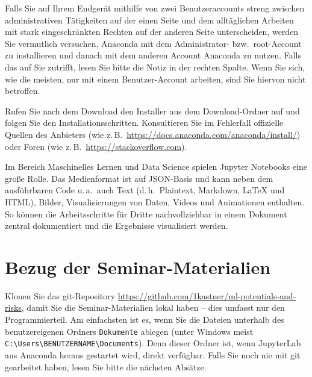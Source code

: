 \documentclass[nobib]{tufte-handout}
\begin{document}
Falls Sie auf Ihrem Endgerät mithilfe von zwei Benutzeraccounts streng zwischen administrativen Tätigkeiten auf der einen Seite und dem alltäglichen Arbeiten mit stark eingeschränkten Rechten auf der anderen Seite unterscheiden, werden Sie vermutlich versuchen, Anaconda mit dem Administrator- bzw.\ root-Account zu installieren und danach mit dem anderen Account Anaconda zu nutzen.
Falls das auf Sie zutrifft, lesen Sie bitte die Notiz in der rechten Spalte.
%
Wenn Sie sich, wie die meisten, nur mit einem Benutzer-Account arbeiten, sind Sie hiervon nicht betroffen.

Rufen Sie nach dem Download den Installer aus dem Download-Ordner auf und folgen Sie den Installationsschritten.
Konsultieren Sie im Fehlerfall offizielle Quellen des Anbieters
(wie z.\,B.\ \url{https://docs.anaconda.com/anaconda/install/})
oder Foren
(wie z.\,B.\ \url{https://stackoverflow.com}).


Im Bereich Maschinelles Lernen und Data Science spielen Jupyter Notebooks eine  große Rolle.
Das Medienformat ist auf JSON-Basis und kann neben dem ausführbaren Code
u.\,a.\ auch
Text (d.\,h.\ Plaintext, Markdown, LaTeX und HTML),
Bilder,
Visualisierungen von Daten,
Videos und
Animationen
enthalten.
So können die Arbeitsschritte für Dritte nachvollziehbar in einem Dokument zentral dokumentiert und die Ergebnisse visualisiert werden.


\section{Bezug der Seminar-Materialien}
\label{sec:git-clone}

Klonen Sie das git-Repository
\url{https://github.com/1kastner/ml-potentials-and-risks},
damit Sie die Seminar-Materialien lokal haben -- dies umfasst nur den Programmierteil.
Am einfachsten ist es, wenn Sie die Dateien unterhalb des benutzer\-eigenen Ordners \texttt{Dokumente} ablegen
(unter Windows meist \texttt{C:\textbackslash{}Users\textbackslash{}BENUTZERNAME\textbackslash{}Documents}).
Denn dieser Ordner ist, wenn JupyterLab aus Anaconda heraus gestartet wird, direkt verfügbar.
Falls Sie noch nie mit git gearbeitet haben, lesen Sie bitte die nächsten Absätze.
\end{document}
